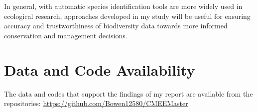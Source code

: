 \documentclass[a4paper,12pt]{article}
\begin{document}
In general, with automatic species identification tools are more widely used in ecological research, approaches developed in my study will be useful for ensuring accuracy and trustworthiness of biodiversity data towards more informed conservation and management decisions.


\section*{Data and Code Availability}
The data and codes that support the findings of my report are available from the repositories: \href{https://github.com/Bowen12580/CMEEMaster}{https://github.com/Bowen12580/CMEEMaster}



\newpage







\end{document}
